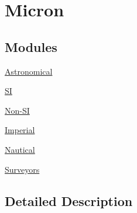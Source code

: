 \hypertarget{group___e_g_x_math-_conversions-_length_conversions-_non-_s_i-_micron}{}\section{Micron}
\label{group___e_g_x_math-_conversions-_length_conversions-_non-_s_i-_micron}
\subsection*{Modules}
\begin{DoxyCompactItemize}
\item 
\mbox{\hyperlink{group___e_g_x_math-_conversions-_length_conversions-_non-_s_i-_micron-_astronomical}{Astronomical}}
\item 
\mbox{\hyperlink{group___e_g_x_math-_conversions-_length_conversions-_non-_s_i-_micron-_s_i}{SI}}
\item 
\mbox{\hyperlink{group___e_g_x_math-_conversions-_length_conversions-_non-_s_i-_micron-_non-_s_i}{Non-\/\+SI}}
\item 
\mbox{\hyperlink{group___e_g_x_math-_conversions-_length_conversions-_non-_s_i-_micron-_imperial}{Imperial}}
\item 
\mbox{\hyperlink{group___e_g_x_math-_conversions-_length_conversions-_non-_s_i-_micron-_nautical}{Nautical}}
\item 
\mbox{\hyperlink{group___e_g_x_math-_conversions-_length_conversions-_non-_s_i-_micron-_surveyors}{Surveyors}}
\end{DoxyCompactItemize}


\subsection{Detailed Description}

